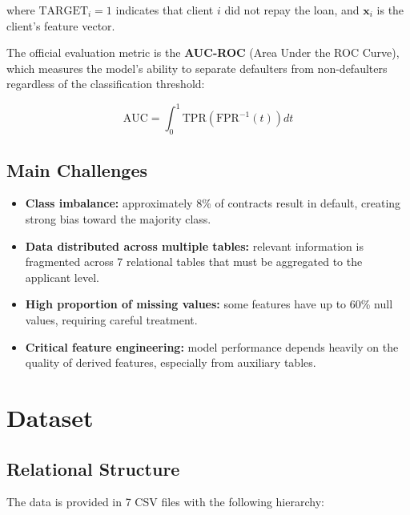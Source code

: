 \documentclass[12pt, a4paper]{article}
\begin{document}
where $\text{TARGET}_i = 1$ indicates that client $i$ did not repay the loan, and
$\mathbf{x}_i$ is the client's feature vector.

The official evaluation metric is the \textbf{AUC-ROC} (Area Under the ROC Curve),
which measures the model's ability to separate defaulters from non-defaulters regardless
of the classification threshold:

\begin{equation}
    \text{AUC} = \int_0^1 \text{TPR}\!\left(\text{FPR}^{-1}(t)\right) dt
\end{equation}

\subsection{Main Challenges}

\begin{itemize}
    \item \textbf{Class imbalance:} approximately 8\% of contracts result in default,
          creating strong bias toward the majority class.
    \item \textbf{Data distributed across multiple tables:} relevant information is
          fragmented across 7 relational tables that must be aggregated to the applicant
          level.
    \item \textbf{High proportion of missing values:} some features have up to 60\%
          null values, requiring careful treatment.
    \item \textbf{Critical feature engineering:} model performance depends heavily on
          the quality of derived features, especially from auxiliary tables.
\end{itemize}

\section{Dataset}

\subsection{Relational Structure}

The data is provided in 7 CSV files with the following hierarchy:
\end{document}
